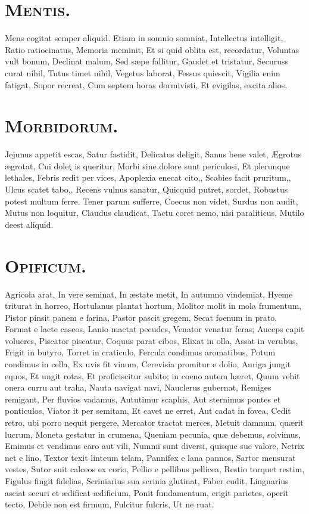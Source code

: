 \documentclass[12pt, twocolumn]{memoir}
\begin{document}
\section*{\textsc{Mentis.}}

Mens cogitat semper aliquid.
Etiam in somnio somniat,
Intellectus intelligit,
Ratio ratiocinatus,
Memoria meminit,
Et si quid oblita est, recordatur,
Voluntas vult bonum,
Declinat malum,
Sed sæpe fallitur,
Gaudet et tristatur,
Securuss curat nihil,
Tutus timet nihil,
Vegetus laborat,
Fessus quiescit,
Vigilia enim fatigat,
Sopor recreat,
Cum septem horas dormivisti,
Et evigilas, excita alios.

\section*{\textsc{Morbidorum.}}

Jejunus appetit escas,
Satur fastidit,
Delicatus deligit,
Sanus bene valet,
Ægrotus ægrotat,
Cui doleţ is queritur,
Morbi sine dolore sunt periculosi,
Et plerunque lethales,
Febris redit per vices,
Apoplexia enecat cito,,
Scabies facit pruritum,,
Ulcus scatet tabo,,
Recens vulnus sanatur,
Quicquid putret, sordet,
Robustus potest multum ferre.
Tener parum sufferre,
Coecus non videt,
Surdus non audit,
Mutus non loquitur,
Claudus claudicat,
Tactu coret nemo, nisi paraliticus,
Mutilo deest aliquid.

\section*{\textsc{Opificum.}}

Agricola arat,
In vere seminat,
In æstate metit,
In autumno vindemiat,
Hyeme triturat in horreo,
Hortulanus plantat hortum,
Molitor molit in mola frumentum,
Pistor pinsit panem e farina,
Pastor pascit gregem,
Secat foenum in prato,
Format e lacte caseos,
Lanio mactat pecudes,
Venator venatur feras;
Auceps capit volucres,
Piscator piscatur,
Coquus parat cibos,
Elixat in olla,
Assat in verubus,
Frigit in butyro,
Torret in craticulo,
Fercula condimus aromatibus,
Potum condimus in cella,
Ex uvis fit vinum,
Cerevisia promitur e dolio,
Auriga jungit equos,
Et ungit rotas,
Et proficiscitur subito; in coeno autem hæret,
Quum vehit onera curru aut traha,
Nauta navigat navi,
Nauclerus gubernat,
Remiges remigant,
Per fluvios vadamus,
Aututimur scaphis,
Aut sternimus pontes et ponticulos,
Viator it per semitam,
Et cavet ne erret,
Aut cadat in fovea,
Cedit retro, ubi porro nequit pergere,
Mercator tractat merces,
Metuit damnum,
quærit lucrum,
Moneta gestatur in crumena,
Queniam pecunia, quæ debemus, solvimus,
Emimus et vendimus caro aut vili,
Nummi sunt diversi, quisque sue valore,
Netrix net e lino,
Textor texit linteum telam,
Pannifex e lana pannos,
Sartor mensurat vestes,
Sutor suit calceos ex corio,
Pellio e pellibus pellicea,
Restio torquet restim,
Figulus fingit fidelias,
Scriniarius sua scrinia glutinat,
Faber cudit,
Lingnarius asciat securi et ædificat ædificium,
Ponit fundamentum, erigit parietes,
operit tecto,
Debile non est firmum,
Fulcitur fulcris,
Ut ne ruat.
\end{document}
